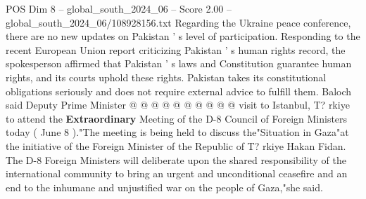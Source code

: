 \begin{textsample}{POS Dim 8 – global\_south\_2024\_06 – Score 2.00 – global\_south\_2024\_06/108928156.txt}
Regarding the Ukraine peace conference, there are no new updates on Pakistan ' s level of participation.
Responding to the recent European Union report criticizing Pakistan ' s human rights record, the spokesperson affirmed that Pakistan ' s laws and Constitution guarantee human rights, and its courts uphold these rights.
Pakistan takes its constitutional obligations seriously and does not require external advice to fulfill them.
Baloch said Deputy Prime Minister @ @ @ @ @ @ @ @ @ @ visit to Istanbul, T? rkiye to attend the \textbf{Extraordinary} Meeting of the D-8 Council of Foreign Ministers today ( June 8 )."The meeting is being held to discuss the"Situation in Gaza"at the initiative of the Foreign Minister of the Republic of T? rkiye Hakan Fidan.
The D-8 Foreign Ministers will deliberate upon the shared responsibility of the international community to bring an urgent and unconditional ceasefire and an end to the inhumane and unjustified war on the people of Gaza,"she said.

\end{textsample}
